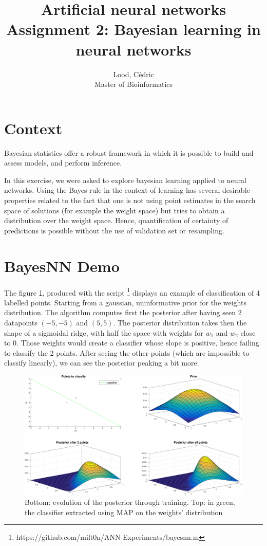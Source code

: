 \documentclass[11pt, a4paper]{article}
\title{ \huge Artificial neural networks \\ 
  { \large Assignment 2: Bayesian learning in neural networks }}
\author{
        Lood, Cédric \\
        \small Master of Bioinformatics
}
\begin{document}
\maketitle

\section{Context}
Bayesian statistics offer a robust framework in which it is possible
to build and assess models, and perform inference.

In this exercise, we were asked to explore bayesian learning applied
to neural networks. Using the Bayes rule in the context of learning
has several desirable properties related to the fact that one is not
using point estimates in the search space of solutions (for example
the weight space) but tries to obtain a distribution over the weight
space. Hence, quantification of certainty of predictions is possible
without the use of validation set or resampling.

\section{BayesNN Demo}

The figure \ref{fig:bayesnn}, produced with the script \footnote{
  https://github.com/milt0n/ANN-Experiments/bayesnn.m} displays an
example of classification of 4 labelled points. Starting from a
gaussian, uninformative prior for the weights distribution. The
algorithm computes first the posterior after having seen 2 datapoints
$(-5,-5)$ and $(5,5)$. The posterior distribution takes then the shape
of a sigmoidal ridge, with half the space with weights for $w_1$ and
$w_2$ close to $0$. Those weights would create a classifier whose
slope is positive, hence failing to classify the 2 points. After
seeing the other points (which are impossible to classify linearly),
we can see the posterior peaking a bit more.

\begin{figure}[H]
    \centering
    \includegraphics[scale=.40]{bayesnn.pdf}
    \caption{Bottom: evolution of the posterior through training. Top:
      in green, the classifier extracted using MAP on the weights'
      distribution}
    \label{fig:bayesnn}
\end{figure}
\end{document}
